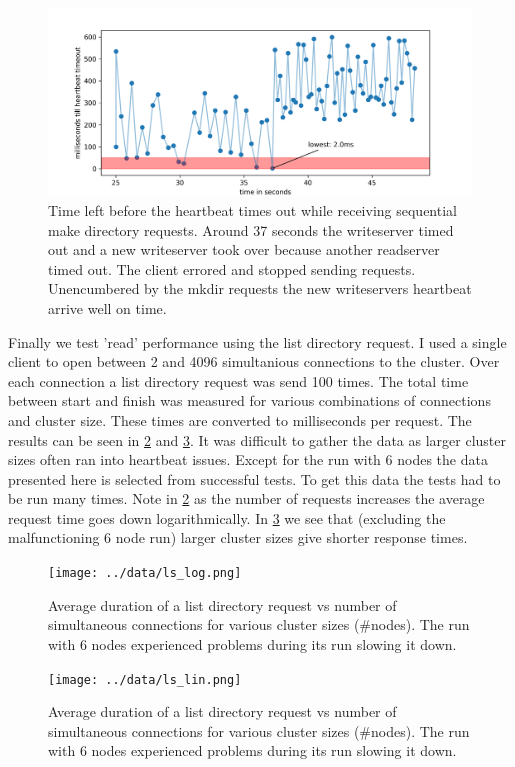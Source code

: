 \begin{figure}[htbp]
	\centering
	\includegraphics{../data/hb_timeout.png}
	\caption{Time left before the heartbeat times out while receiving sequential make directory requests. Around 37 seconds the writeserver timed out and a new writeserver took over because another readserver timed out. The client errored and stopped sending requests. Unencumbered by the mkdir requests the new writeservers heartbeat arrive well on time.}
	\label{fig:hbt}
\end{figure}

Finally we test 'read' performance using the list directory request. I used a single client to open between 2 and 4096 simultanious connections to the cluster. Over each connection a list directory request was send 100 times. The total time between start and finish was measured for various combinations of connections and cluster size. These times are converted to milliseconds per request. The results can be seen in \cref{fig:ls_log} and \cref{fig:ls_lin}. 
It was difficult to gather the data as larger cluster sizes often ran into heartbeat issues. Except for the run with 6 nodes the data presented here is selected from successful tests. To get this data the tests had to be run many times.
Note in \cref{fig:ls_log} as the number of requests increases the average request time goes down logarithmically. In \cref{fig:ls_lin} we see that (excluding the malfunctioning 6 node run) larger cluster sizes give shorter response times.

\begin{figure}[htbp]
	\centering
	\texttt{[image: ../data/ls\_log.png]}
	\caption{Average duration of a list directory request vs number of simultaneous connections for various cluster sizes (\#nodes). The run with 6 nodes experienced problems during its run slowing it down.}
	\label{fig:ls_log}
\end{figure}

\begin{figure}[htbp]
	\centering
	\texttt{[image: ../data/ls\_lin.png]}
	\caption{Average duration of a list directory request vs number of simultaneous connections for various cluster sizes (\#nodes). The run with 6 nodes experienced problems during its run slowing it down.}
	\label{fig:ls_lin}
\end{figure}
